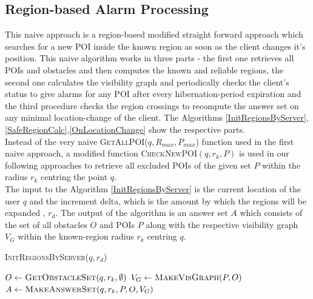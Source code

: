 \documentclass{sig-alternate}
\begin{document}
\subsection{Region-based Alarm Processing}
This naive approach is a region-based modified straight forward approach which searches for a new POI inside the known region as soon as the client changes it's position.
This naive algorithm works in three parts - the first one retrieves all POIs and obstacles and then computes the known and reliable regions, the second one calculates the visibility graph and periodically checks the client's status to give alarms for any POI after every hibernation-period expiration and the third procedure checks the region crossings to recompute the answer set on any minimal location-change of the client.
The Algorithms \ref{InitRegionsByServer},\ref{SafeRegionCalc},\ref{OnLocationChange} show the respective parts.\\
Instead of the very naive \textsc{GetAllPOI}($q, R_{max},P_{max}$) function used in the first naive approach, a modified function \textsc{CheckNewPOI}$(q, r_{k}, P)$ is used in our following approaches to retrieve all excluded POIs of the given set $P$ within the radius $r_{k}$ centring the point $q$. \\
The input to the Algorithm \ref{InitRegionsByServer} is the current location of the user $q$ and the increment delta, which is the amount by which the regions will be expanded , $r_d$. The output of the algorithm is an answer set $A$ which consists of the set of all obstacles $O$ and POIs $P$ along with the respective visibility graph $V_G$ within the known-region radius $r_{k}$ centring $q$.

\begin{algorithm}
\caption{\textsc{InitRegionsByServer}($q,r_d$)}
\label{InitRegionsByServer}

    
	 $O \gets \textsc{GetObstacleSet}(q, r_k, \emptyset)$\;
	 $V_G \gets \textsc{MakeVisGraph}(P, O)$	\;
	 \Return $A \gets \textsc{MakeAnswerSet}(q, r_k, P, O, V_G)$ 
\end{algorithm}
\end{document}
